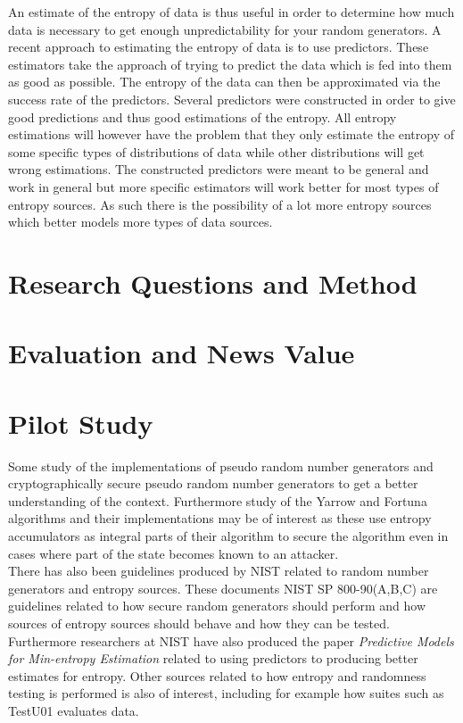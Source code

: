 \documentclass[a4paper,11pt]{report}
\begin{document}
\noindent
An estimate of the entropy of data is thus useful in order to determine
how much data is necessary to get enough unpredictability for your random
generators. A recent approach to estimating the entropy of data is to use 
predictors. These estimators take the approach of trying to predict the data
which is fed into them as good as possible. The entropy of the data can then
be approximated via the success rate of the predictors. Several predictors were
constructed in order to give good predictions and thus good estimations of the 
entropy. All entropy estimations will however have the problem that they only
estimate the entropy of some specific types of distributions of data while 
other distributions will get wrong estimations. The constructed predictors were 
meant to be general and work in general but more specific estimators will work
better for most types of entropy sources. As such there is the possibility of
a lot more entropy sources which better models more types of data sources.

\section*{Research Questions and Method}
\section*{Evaluation and News Value}
\section*{Pilot Study}
Some study of the implementations of pseudo random number generators and
cryptographically secure pseudo random number generators to get a better
understanding of the context. Furthermore study of the Yarrow and
Fortuna algorithms and their implementations may be of interest as these 
use entropy accumulators as integral parts of their algorithm to secure the 
algorithm even in cases where part of the state becomes known to an attacker.
\\

\noindent
There has also been guidelines produced by NIST related to random number
generators and entropy sources. These documents NIST SP 800-90(A,B,C) 
\cite{800-90A}\cite{800-90B}\cite{800-90C} are guidelines related to 
how secure random generators should perform and how sources of entropy 
sources should behave and how they can be tested.
Furthermore researchers at NIST have also produced 
the paper \textit{Predictive Models for Min-entropy Estimation}
\cite{eprint-2015-26658}
related to using predictors to producing better estimates for entropy.
Other sources related to how entropy and randomness testing is performed is
also of interest, including for example how suites such as TestU01 evaluates
data.
\\
\end{document}
